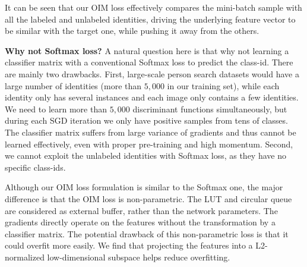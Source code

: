 It can be seen that our OIM loss effectively compares the mini-batch sample with all the labeled and unlabeled identities, driving the underlying feature vector to be similar with the target one, while pushing it away from the others.

\textbf{Why not Softmax loss?} A natural question here is that why not learning a classifier matrix with a conventional Softmax loss to predict the class-id. There are mainly two drawbacks. First, large-scale person search datasets would have a large number of identities (more than $5,000$ in our training set), while each identity only has several instances and each image only contains a few identities. We need to learn more than $5,000$ discriminant functions simultaneously, but during each SGD iteration we only have positive samples from tens of classes. The classifier matrix suffers from large variance of gradients and thus cannot be learned effectively, even with proper pre-training and high momentum. Second, we cannot exploit the unlabeled identities with Softmax loss, as they have no specific class-ids.

Although our OIM loss formulation is similar to the Softmax one, the major difference is that the OIM loss is non-parametric. The LUT and circular queue are considered as external buffer, rather than the network parameters. The gradients directly operate on the features without the transformation by a classifier matrix. The potential drawback of this non-parametric loss is that it could overfit more easily. We find that projecting the features into a L2-normalized low-dimensional subspace helps reduce overfitting.

